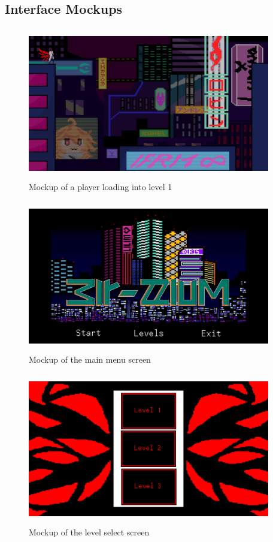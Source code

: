\documentclass[10pt,conference,onecolumn,compsoc]{IEEEtran}
\begin{document}
\subsection{Interface Mockups}
\begin{figure}[ht!]
\includegraphics[height=250px, width=400px]{Level1 Mockup.png}
\caption{Mockup of a player loading into level 1}
\label{Level1 Mockup}
\end{figure}

\begin{figure}[ht!]
\includegraphics[height=250px, width=400px]{Start Mockup.png}
\caption{Mockup of the main menu screen}
\label{Start Mockup}
\end{figure}

\begin{figure}[ht!]
\includegraphics[height=250px, width=400px]{Select Mockup.png}
\caption{Mockup of the level select screen}
\label{Select Mockup}
\end{figure}
\end{document}
